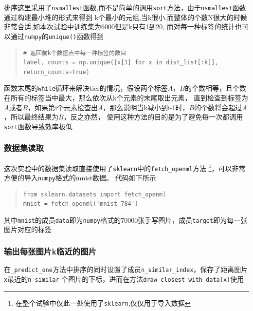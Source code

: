 \documentclass[UTF8]{ctexart}
\begin{document}
\newpage
排序这里采用了\lstinline{nsmallest}函数,而不是简单的调用\lstinline{sort}方法，由于\lstinline{nsmallest}函数通过构建最小堆的形式来得到
k个最小的元组,当k很小,而整体的个数N很大的时候非常合适,如本次试验中训练集为6000但是k只有1到20,
而对每一种标签的统计也可以通过\lstinline{numpy}的\lstinline{unique()}函数得到
\begin{quote}
    \begin{lstlisting}[breaklines, frame=tb, numbers=none]
# 返回前k个数据点中每一种标签的数目
label, counts = np.unique([x[1] for x in dist_list[:k]], return_counts=True)    
    \end{lstlisting}
\end{quote}

函数末尾的\lstinline{while}循环来解决tier的情况，假设两个标签$A$，$B$的个数相等，且个数在所有的标签当中最大，那么依次从k个元素的末尾取出元素，
直到检查到标签为$A$或者$B$，如果第i个元素检查出$A$，那么说明当k减小到i-1时，$B$的个数将会超过$A$，所以最终结果为$B$，反之亦然，
使用这种方法的目的是为了避免每一次都调用\lstinline{sort}函数导致效率极低

\vspace*{5em}


\subsubsection{数据集读取}
这次实验中的数据集读取直接使用了\lstinline{sklearn}中的\lstinline{fetch_openml}方法
\footnote{在整个试验中仅此一处使用了\lstinline{sklearn},仅仅用于导入数据}，可以非常方便的导入\lstinline{numpy}格式的mnist数据。
代码如下所示
\begin{quote}
    \begin{lstlisting}[breaklines]
from sklearn.datasets import fetch_openml
mnist = fetch_openml('mnist_784')
    \end{lstlisting}
\end{quote}
其中\lstinline{mnist}的成员\lstinline{data}即为\lstinline{numpy}格式的70000张手写图片，成员\lstinline{target}即为每一张图片对应的标签


\vspace*{5em}
\subsubsection{输出每张图片k临近的图片}
在\lstinline{_predict_one}方法中排序的同时设置了成员\lstinline{n_similar_index}，保存了距离图片\lstinline{x}最近的\lstinline{n_similar}
个图片的下标，进而在方法\lstinline{draw_closest_with_data(x)}使用
\end{document}
